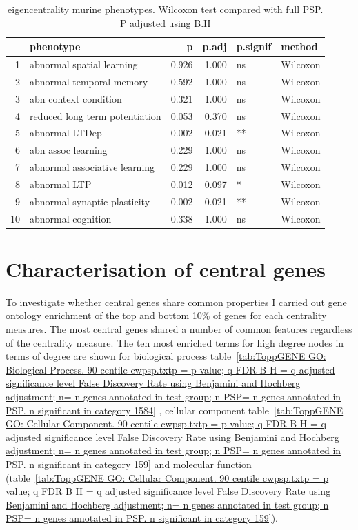 \begin{table}[ht]
\centering
\begin{tabular}{rlrrll}
  \toprule
 & phenotype & p & p.adj & p.signif & method \\ 
  \midrule
1 & abnormal spatial learning & 0.926 & 1.000 & ns & Wilcoxon \\ 
  2 & abnormal temporal memory & 0.592 & 1.000 & ns & Wilcoxon \\ 
  3 & abn context condition & 0.321 & 1.000 & ns & Wilcoxon \\ 
  4 & reduced long term potentiation & 0.053 & 0.370 & ns & Wilcoxon \\ 
  5 & abnormal LTDep & 0.002 & 0.021 & ** & Wilcoxon \\ 
  6 & abn assoc learning & 0.229 & 1.000 & ns & Wilcoxon \\ 
  7 & abnormal associative learning & 0.229 & 1.000 & ns & Wilcoxon \\ 
  8 & abnormal LTP & 0.012 & 0.097 & * & Wilcoxon \\ 
  9 & abnormal synaptic plasticity & 0.002 & 0.021 & ** & Wilcoxon \\ 
  10 & abnormal cognition & 0.338 & 1.000 & ns & Wilcoxon \\ 
   \bottomrule
\end{tabular}
\caption{eigencentrality murine phenotypes. Wilcoxon test compared with full PSP. P adjusted using B.H} 
\label{tab:eigencentrality murine phenotypes. Wilcoxon test compared with full PSP}
\end{table}


\clearpage



\section{Characterisation of central genes}

To investigate whether central genes share common properties I carried out gene ontology enrichment of the top and bottom 10\% of genes for each centrality measures. The most central genes shared a number of common features regardless of the centrality measure. The ten most enriched terms for high degree nodes in terms of degree are shown for biological process table~\ref{tab:ToppGENE GO: Biological Process. 90 centile cwpsp.txtp = p value; q FDR B H = q adjusted significance level False Discovery Rate using Benjamini and Hochberg adjustment; n= n genes annotated in test group; n PSP= n genes annotated in PSP. n significant in category 1584} , cellular component table~\ref{tab:ToppGENE GO: Cellular Component. 90 centile cwpsp.txtp = p value; q FDR B H = q adjusted significance level False Discovery Rate using Benjamini and Hochberg adjustment; n= n genes annotated in test group; n PSP= n genes annotated in PSP. n significant in category 159} and molecular function (table~\ref{tab:ToppGENE GO: Cellular Component. 90 centile cwpsp.txtp = p value; q FDR B H = q adjusted significance level False Discovery Rate using Benjamini and Hochberg adjustment; n= n genes annotated in test group; n PSP= n genes annotated in PSP. n significant in category 159}). 

